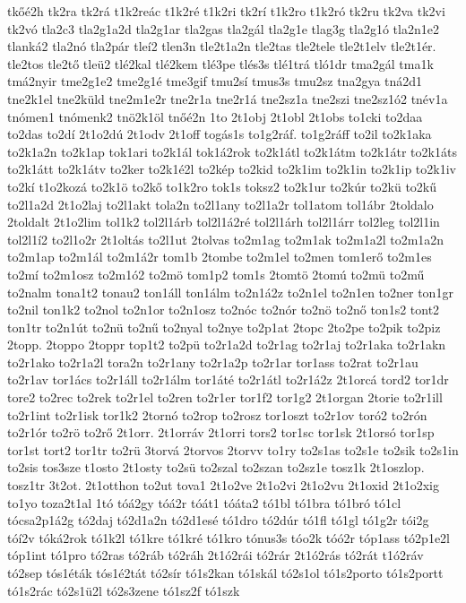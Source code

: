 {tkőé2h
tk2ra
tk2rá
t1k2reác
t1k2ré
t1k2ri
tk2rí
t1k2ro
t1k2ró
tk2ru
tk2va
tk2vi
tk2vó
tla2c3
tla2g1a2d
tla2g1ar
tla2gas
tla2gál
tla2g1e
tlag3g
tla2g1ó
tla2n1e2
tlanká2
tla2nó
tla2pár
tleí2
tlen3n
tle2t1a2n
tle2tas
tle2tele
tle2t1elv
tle2t1ér.
tle2tos
tle2tő
tleü2
tlé2kal
tlé2kem
tlé3pe
tlés3s
tlé1trá
tló1dr
tma2gál
tma1k
tmá2nyir
tme2g1e2
tme2g1é
tme3gif
tmu2sí
tmus3s
tmu2sz
tna2gya
tná2d1
tne2k1el
tne2küld
tne2m1e2r
tne2r1a
tne2r1á
tne2sz1a
tne2szi
tne2sz1ó2
tnév1a
tnómen1
tnómenk2
tnö2k1öl
tnőé2n
1to
2t1obj
2t1obl
2t1obs
to1cki
to2daa
to2das
to2dí
2t1o2dú
2t1odv
2t1off
togás1s
to1g2ráf.
to1g2ráff
to2il
to2k1aka
to2k1a2n
to2k1ap
tok1ari
to2k1ál
tok1á2rok
to2k1átl
to2k1átm
to2k1átr
to2k1áts
to2k1átt
to2k1átv
to2ker
to2k1é2l
to2kép
to2kid
to2k1im
to2k1in
to2k1ip
to2k1iv
to2kí
t1o2kozá
to2k1ö
to2kő
to1k2ro
tok1s
toksz2
to2k1ur
to2kúr
to2kü
to2kű
to2l1a2d
2t1o2laj
to2l1akt
tola2n
to2l1any
to2l1a2r
tol1atom
tol1ábr
2toldalo
2toldalt
2t1o2lim
tol1k2
tol2l1árb
tol2l1á2ré
tol2l1árh
tol2l1árr
tol2leg
tol2l1in
tol2l1í2
to2l1o2r
2t1oltás
to2l1ut
2tolvas
to2m1ag
to2m1ak
to2m1a2l
to2m1a2n
to2m1ap
to2m1ál
to2m1á2r
tom1b
2tombe
to2m1el
to2men
tom1erő
to2m1es
to2mí
to2m1osz
to2m1ó2
to2mö
tom1p2
tom1s
2tomtö
2tomú
to2mü
to2mű
to2nalm
tona1t2
tonau2
ton1áll
ton1álm
to2n1á2z
to2n1el
to2n1en
to2ner
ton1gr
to2nil
ton1k2
to2nol
to2n1or
to2n1osz
to2nóc
to2nór
to2nö
to2nő
ton1s2
tont2
ton1tr
to2n1út
to2nü
to2nű
to2nyal
to2nye
to2p1at
2topc
2to2pe
to2pik
to2piz
2topp.
2toppo
2toppr
top1t2
to2pü
to2r1a2d
to2r1ag
to2r1aj
to2r1aka
to2r1akn
to2r1ako
to2r1a2l
tora2n
to2r1any
to2r1a2p
to2r1ar
tor1ass
to2rat
to2r1au
to2r1av
tor1ács
to2r1áll
to2r1álm
tor1áté
to2r1átl
to2r1á2z
2t1orcá
tord2
tor1dr
tore2
to2rec
to2rek
to2r1el
to2ren
to2r1er
tor1f2
tor1g2
2t1organ
2torie
to2r1ill
to2r1int
to2r1isk
tor1k2
2tornó
to2rop
to2rosz
tor1oszt
to2r1ov
toró2
to2rón
to2r1ór
to2rö
to2rő
2t1orr.
2t1orráv
2t1orri
tors2
tor1sc
tor1sk
2t1orsó
tor1sp
tor1st
tort2
tor1tr
to2rü
3torvá
2torvos
2torvv
to1ry
to2s1as
to2s1e
to2sik
to2s1in
to2sis
tos3sze
t1osto
2t1osty
to2sü
to2szal
to2szan
to2sz1e
tosz1k
2t1oszlop.
tosz1tr
3t2ot.
2t1otthon
to2ut
tova1
2t1o2ve
2t1o2vi
2t1o2vu
2t1oxid
2t1o2xig
to1yo
toza2t1al
1tó
tóá2gy
tóá2r
tóát1
tóáta2
tó1bl
tó1bra
tó1bró
tó1cl
tócsa2p1á2g
tó2daj
tó2d1a2n
tó2d1esé
tó1dro
tó2dúr
tó1fl
tó1gl
tó1g2r
tói2g
tóí2v
tóká2rok
tó1k2l
tó1kre
tó1kré
tó1kro
tónus3s
tóo2k
tóó2r
tóp1ass
tó2p1e2l
tóp1int
tó1pro
tó2ras
tó2ráb
tó2ráh
2t1ó2rái
tó2rár
2t1ó2rás
tó2rát
t1ó2ráv
tó2sep
tós1éták
tós1é2tát
tó2sír
tó1s2kan
tó1skál
tó2s1ol
tó1s2porto
tó1s2portt
tó1s2rác
tó2s1ü2l
tó2s3zene
tó1sz2f
tó1szk
}
